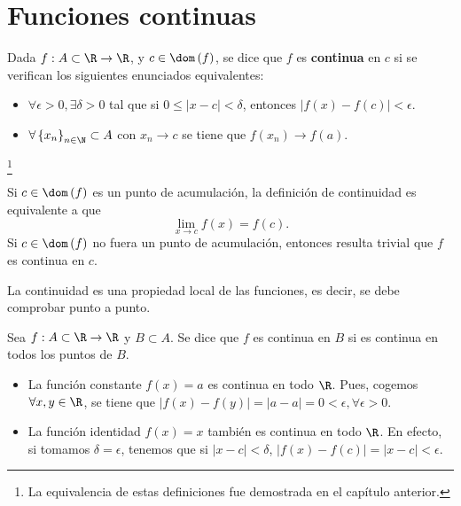 \chapter{Funciones continuas}
\begin{fdefinition}[Continuidad]
\normalfont Dada $\displaystyle f : A \subset \R \to \R $,  y $\displaystyle c \in \dom\left(f\right) $, se dice que $\displaystyle f $ es \textbf{continua} en $\displaystyle c $ si se verifican los siguientes enunciados equivalentes:
\begin{itemize}
\item $\displaystyle \forall \epsilon > 0, \exists \delta > 0 $ tal que si $\displaystyle 0 \leq \left|x - c\right|<\delta $, entonces $\displaystyle \left|f\left(x\right)-f\left(c\right)\right| < \epsilon  $.
\item $\displaystyle \forall \left\{ x_{n}\right\} _{n\in \N} \subset A $ con $\displaystyle x_{n} \to c $ se tiene que $\displaystyle f\left(x_{n}\right) \to f\left(a\right) $.
\end{itemize}
\end{fdefinition}
\footnote{La equivalencia de estas definiciones fue demostrada en el capítulo anterior.} 
\begin{observation}
\normalfont Si $\displaystyle c \in \dom\left(f\right) $ es un punto de acumulación, la definición de continuidad es equivalente a que 
\[\lim_{x \to c}f\left(x\right) = f\left(c\right) .\]
Si $\displaystyle c \in \dom\left(f\right) $ no fuera un punto de acumulación, entonces resulta trivial que $\displaystyle f $ es continua en $\displaystyle c $. 
\end{observation}
La continuidad es una propiedad local de las funciones, es decir, se debe comprobar punto a punto.
\begin{fdefinition}[]
\normalfont Sea $\displaystyle f : A \subset \R \to \R $ y $\displaystyle B \subset A $. Se dice que $\displaystyle f $ es continua en $\displaystyle B $ si es continua en todos los puntos de $\displaystyle B $.
\end{fdefinition}
\begin{eg}
\normalfont 
\begin{itemize}
\item La función constante $\displaystyle f\left(x\right) = a $ es continua en todo $\displaystyle \R $. Pues, cogemos $\displaystyle \forall x,y \in \R $, se tiene que $\displaystyle \left|f\left(x\right)-f\left(y\right)\right| = \left|a - a\right| = 0 < \epsilon, \forall \epsilon > 0 $.
\item La función identidad $\displaystyle f\left(x\right) = x $ también es continua en todo $\displaystyle \R $. En efecto, si tomamos $\displaystyle \delta = \epsilon  $, tenemos que si $\displaystyle \left|x - c\right| < \delta  $, $\displaystyle \left|f\left(x\right)-f\left(c\right)\right| = \left|x - c\right| < \epsilon  $.
\end{itemize}
\end{eg}

